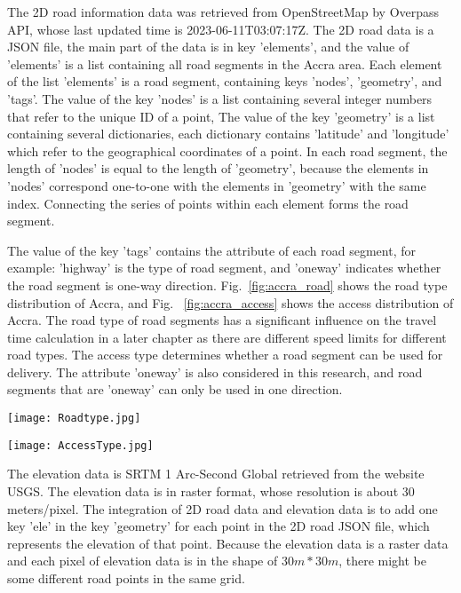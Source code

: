 \documentclass[final-report]{report-template}
\begin{document}
The 2D road information data was retrieved from OpenStreetMap by Overpass API, whose last updated time is 2023-06-11T03:07:17Z.
The 2D road data is a JSON file, the main part of the data is in key 'elements', and the value of 'elements' is a list containing all road segments in the Accra area.
Each element of the list 'elements' is a road segment, containing keys 'nodes', 'geometry', and 'tags'. 
The value of the key 'nodes' is a list containing several integer numbers that refer to the unique ID of a point, 
The value of the key 'geometry' is a list containing several dictionaries, each dictionary contains 'latitude' and 'longitude' which refer to the geographical coordinates of a point.
In each road segment, the length of 'nodes' is equal to the length of 'geometry', because the elements in 'nodes' correspond one-to-one with the elements in 'geometry' with the same index.
Connecting the series of points within each element forms the road segment.

The value of the key 'tags' contains the attribute of each road segment, for example: 'highway' is the type of road segment, and 'oneway' indicates whether the road segment is one-way direction.
Fig.~\ref{fig:accra_road} shows the road type distribution of Accra, and Fig.~ \ref{fig:accra_access} shows the access distribution of Accra. 
The road type of road segments has a significant influence on the travel time calculation in a later chapter as there are different speed limits for different road types.
The access type determines whether a road segment can be used for delivery. The attribute 'oneway' is also considered in this research, and road segments that are 'oneway' can only be used in one direction.
\begin{figure*}[htbp]
    \centering
    \begin{minipage}[t]{0.48\textwidth}
    \centering
    \texttt{[image: Roadtype.jpg]}
    \caption{\label{fig:accra_road} The road types of Accra. X-axis: road types of Accra, Y-axis: the quantity of each type.}
    \end{minipage}
    \begin{minipage}[t]{0.48\textwidth}
    \centering
    \texttt{[image: AccessType.jpg]}
    \caption{\label{fig:accra_access} The access types of Accra. X-axis: access types of Accra, Y-axis: the quantity of each type.}
    \end{minipage}
\end{figure*}

The elevation data is SRTM 1 Arc-Second Global retrieved from the website USGS. The elevation data is in raster format, whose resolution is about 30 meters/pixel. 
The integration of 2D road data and elevation data is to add one key 'ele' in the key 'geometry' for each point in the 2D road JSON file, which represents the elevation of that point. 
Because the elevation data is a raster data and each pixel of elevation data is in the shape of $30m*30m$, 
there might be some different road points in the same grid. 
\end{document}
